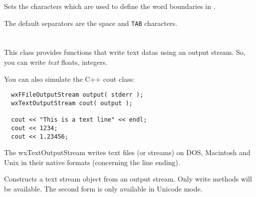 \label{wxtextinputstreamsetstringseparators}


Sets the characters which are used to define the word boundaries in 
.

The default separators are the space and {\tt TAB} characters.


\section{}\label{wxtextoutputstream}

This class provides functions that write text datas using an output stream.
So, you can write {\it text} floats, integers.

You can also simulate the C++ cout class:

\begin{verbatim}
  wxFFileOutputStream output( stderr );
  wxTextOutputStream cout( output );

  cout << "This is a text line" << endl;
  cout << 1234;
  cout << 1.23456;
\end{verbatim}

The wxTextOutputStream writes text files (or streams) on DOS, Macintosh
and Unix in their native formats (concerning the line ending).


\label{wxtextoutputstreamconstr}


Constructs a text stream object from an output stream. Only write methods will
be available. The second form is only available in Unicode mode.



